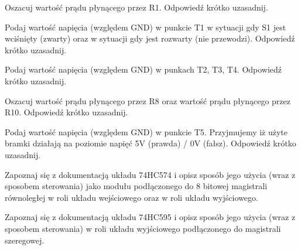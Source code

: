 
\dbEntryCheckResults
Oszacuj wartość prądu płynącego przez R1. Odpowiedź krótko uzasadnij.
\fi

\dbEntryCheckResults
Podaj wartość napięcia (względem GND) w punkcie T1 w sytuacji gdy S1 jest wciśnięty (zwarty) oraz w sytuacji gdy jest rozwarty (nie przewodzi). Odpowiedź krótko uzasadnij.
\fi

\dbEntryCheckResults
Podaj wartość napięcia (względem GND) w punkach T2, T3, T4. Odpowiedź krótko uzasadnij.
\fi

\dbEntryCheckResults
Oszacuj wartość prądu płynącego przez R8 oraz wartość prądu płynącego przez R10. Odpowiedź krótko uzasadnij.
\fi

\dbEntryCheckResults
Podaj wartość napięcia (względem GND) w punkcie T5. Przyjmujemy iż użyte bramki działają na poziomie napięć 5V (prawda) / 0V (fałsz). Odpowiedź krótko uzasadnij.
\fi

\dbEntryCheckResults
Zapoznaj się z dokumentacją układu 74HC574 i opisz sposób jego użycia (wraz z sposobem sterowania) jako modułu podłączonego do 8 bitowej magistrali równoległej w roli układu wejściowego oraz w roli układu wyjściowego.
\fi

\dbEntryCheckResults
Zapoznaj się z dokumentacją układu 74HC595 i opisz sposób jego użycia (wraz z sposobem sterowania) w roli układu wyjściowego podłączonego do magistrali szeregowej.
\fi
